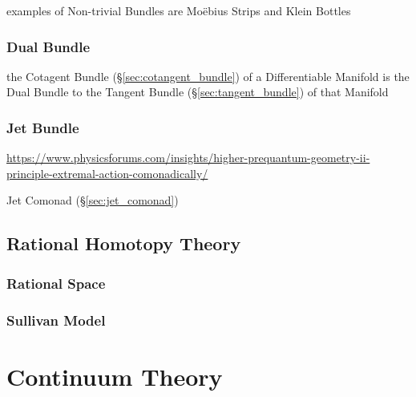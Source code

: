 examples of Non-trivial Bundles are Mo\"ebius Strips and Klein Bottles



\subsubsection{Dual Bundle}\label{sec:dual_bundle}

the Cotagent Bundle (\S\ref{sec:cotangent_bundle}) of a Differentiable Manifold
is the Dual Bundle to the Tangent Bundle (\S\ref{sec:tangent_bundle}) of that
Manifold



\subsubsection{Jet Bundle}\label{sec:jet_bundle}

\url{https://www.physicsforums.com/insights/higher-prequantum-geometry-ii-principle-extremal-action-comonadically/}

\fist Jet Comonad (\S\ref{sec:jet_comonad})



\subsection{Rational Homotopy Theory}\label{sec:rational_homotopy}

\subsubsection{Rational Space}\label{sec:rational_space}

\subsubsection{Sullivan Model}\label{sec:sullivan_model}



\section{Continuum Theory}\label{sec:continuum_theory}

